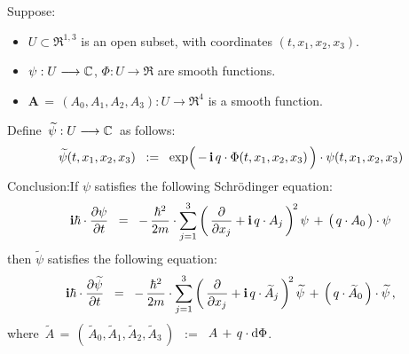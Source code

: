 
\vskip 1.0cm
\begin{theorem}
\mbox{}
\vskip 0.2cm
\noindent
Suppose:
\begin{itemize}
\item
	$U \subset \Re^{1,3}$ is an open subset, with coordinates $(t,x_{1},x_{2},x_{3})$.
\item
	$\psi : U \longrightarrow \mathbb{C}$, $\Phi : U \longrightarrow \Re$ are smooth functions.
\item
	$\mathbf{A} \, = \, (A_{0}, A_{1}, A_{2}, A_{3}) : U \longrightarrow \Re^{4}$ is a smooth function.
\end{itemize}
Define \,$\widetilde{\psi} : U \longrightarrow \mathbb{C}$\, as follows:
\begin{equation*}
\widetilde{\psi}(t,x_{1},x_{2},x_{3})
\;\; := \;\;
	\exp\!\left(\,-\,\overset{{\color{white}.}}{\i}\,q \cdot\Phi(t,x_{1},x_{2},x_{3})\,\right) \cdot \psi(t,x_{1},x_{2},x_{3})
\end{equation*}
Conclusion:\quad If $\psi$ satisfies the following Schr\"{o}dinger equation:
\begin{equation*}
\i\hbar \cdot \dfrac{\partial \psi}{\partial t}
\;\; = \;\;
	-\,\dfrac{\hbar^{2}}{2m}\cdot\overset{3}{\underset{j=1}{\sum}}\left(\,
		\dfrac{\partial}{\partial x_{j}}
		+
		\i\,q\cdot A_{j}
		\,\right)^{\!2}
		\psi
	\,+\,
	\left(\,q \overset{{\color{white}.}}{\cdot} A_{0}\,\right)\cdot\psi
\end{equation*}
then $\widetilde{\psi}$ satisfies the following equation:
\begin{equation*}
\i\hbar \cdot \dfrac{\partial \widetilde{\psi}}{\partial t}
\;\; = \;\;
	-\,\dfrac{\hbar^{2}}{2m}\cdot\overset{3}{\underset{j=1}{\sum}}\left(\,
		\dfrac{\partial}{\partial x_{j}}
		+
		\i\,q\cdot \widetilde{A}_{j}
		\,\right)^{\!2}
		\widetilde{\psi}
	\,+\,
	\left(\,q \overset{{\color{white}.}}{\cdot} \widetilde{A}_{0}\,\right)\cdot\widetilde{\psi}\,,
\end{equation*}
where
\,$\widetilde{A} \,=\, \left(\,\widetilde{A}_{0},\widetilde{A}_{1},\widetilde{A}_{2},\widetilde{A}_{3}\,\right)$
\,$:=$\,
$A \,+\, q\cdot\textnormal{d}\Phi$.
\end{theorem}






